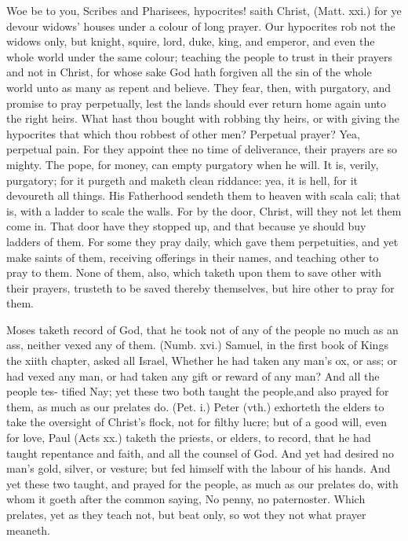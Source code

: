 \documentclass{custom}
\begin{document}
Woe be to you, Scribes and Pharisees, hypocrites! saith 
Christ, (Matt. xxi.) for ye devour widows' houses under a 
colour of long prayer. Our hypocrites rob not the widows 
only, but knight, squire, lord, duke, king, and emperor, and 
even the whole world under the same colour; teaching 
the people to trust in their prayers and not in Christ, for 
whose sake God hath forgiven all the sin of the whole 
world unto as many as repent and believe. They fear, 
then, with purgatory, and promise to pray perpetually, lest 
the lands should ever return home again unto the right 
heirs. What hast thou bought with robbing thy heirs, 
or with giving the hypocrites that which thou robbest of 
other men? Perpetual prayer? Yea, perpetual pain. 
For they appoint thee no time of deliverance, their 
prayers are so mighty. The pope, for money, can empty 
purgatory when he will. It is, verily, purgatory; for it 
purgeth and maketh clean riddance: yea, it is hell, for it 
devoureth all things. His Fatherhood sendeth them to 
heaven with scala cali; that is, with a ladder to scale the 
walls. For by the door, Christ, will they not let them 
come in. That door have they stopped up, and that 
because ye should buy ladders of them. For some they 
pray daily, which gave them perpetuities, and yet make 
saints of them, receiving offerings in their names, and 
teaching other to pray to them. None of them, also, 
which taketh upon them to save other with their prayers, 
trusteth to be saved thereby themselves, but hire other to 
pray for them. 

Moses taketh record of God, that he took not of any 
of the people no much as an ass, neither vexed any of 
them. (Numb. xvi.) Samuel, in the first book of Kings 
the xiith chapter, asked all Israel, Whether he had taken 
any man's ox, or ass; or had vexed any man, or had taken 
any gift or reward of any man? And all the people tes- 
tified Nay; yet these two both taught the people,and also 
prayed for them, as much as our prelates do. (Pet. i.) 
Peter (vth.) exhorteth the elders to take the oversight of 
Christ's flock, not for filthy lucre; but of a good will, 
even for love, Paul (Acts xx.) taketh the priests, or 
elders, to record, that he had taught repentance and faith, 
and all the counsel of God. And yet had desired no 
man's gold, silver, or vesture; but fed himself with the 
labour of his hands. And yet these two taught, and 
prayed for the people, as much as our prelates do, with 
whom it goeth after the common saying, No penny, no 
paternoster. Which prelates, yet as they teach not, but 
beat only, so wot they not what prayer meaneth. 
\end{document}
